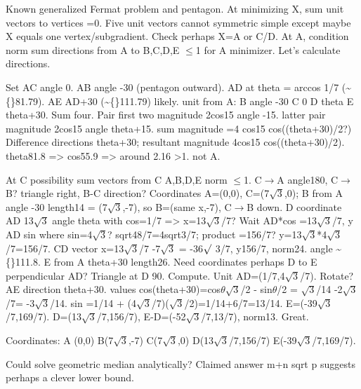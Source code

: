 \begin{decodedreasoningpanel}
Known generalized Fermat problem and pentagon. At minimizing X, sum unit vectors to vertices =0. Five unit vectors cannot symmetric simple except maybe X equals one vertex/subgradient. Check perhaps X=A or C/D. At A, condition norm sum directions from A to B,C,D,E \ensuremath{\leq}1 for A minimizer. Let's calculate directions.

Set AC angle 0. AB angle -30 (pentagon outward). AD at theta = arccos 1/7 (\textasciitilde\{\}81.79). AE AD+30 (\textasciitilde\{\}111.79) likely.
unit from A:
B angle -30
C 0
D theta
E theta+30.
Sum four. Pair first two magnitude 2cos15 angle -15. latter pair magnitude 2cos15 angle theta+15. sum magnitude =4 cos15 cos((theta+30)/2?) Difference directions theta+30; resultant magnitude 4cos15 cos((theta+30)/2). theta81.8 =\textgreater{} cos55.9 =\textgreater{} around 2.16 \textgreater{}1. not A.

At C possibility sum vectors from C A,B,D,E norm \ensuremath{\leq}1. C\ensuremath{\rightarrow}A angle180, C\ensuremath{\rightarrow}B? triangle right, B-C direction? Coordinates A=(0,0), C=(7\ensuremath{\sqrt{3}},0); B from A angle -30 length14 = (7\ensuremath{\sqrt{3}},-7), so B=(same x,-7), C\ensuremath{\rightarrow}B down. D coordinate AD 13\ensuremath{\sqrt{3}} angle theta with cos=1/7 =\textgreater{} x=13\ensuremath{\sqrt{3}}/7? Wait AD*cos =13\ensuremath{\sqrt{3}}/7, y AD sin where sin=4\ensuremath{\sqrt{3}}? sqrt48/7=4sqrt3/7; product =156/7? y=13\ensuremath{\sqrt{3}}*4\ensuremath{\sqrt{3}}/7=156/7. CD vector x=13\ensuremath{\sqrt{3}}/7 -7\ensuremath{\sqrt{3}} = -36\ensuremath{\surd}
  3/7, y156/7, norm24. angle \textasciitilde\{\}111.8.
E from A theta+30 length26. Need coordinates perhaps D to E perpendicular AD? Triangle at D 90. Compute. Unit AD=(1/7,4\ensuremath{\sqrt{3}}/7). Rotate? AE direction theta+30. values cos(theta+30)=cos\ensuremath{\theta}\ensuremath{\sqrt{3}}/2 - sin\ensuremath{\theta}/2 = \ensuremath{\sqrt{3}}/14 -2\ensuremath{\sqrt{3}}/7= -3\ensuremath{\sqrt{3}}/14. sin =1/14 + (4\ensuremath{\sqrt{3}}/7)(\ensuremath{\sqrt{3}}/2)=1/14+6/7=13/14. E=(-39\ensuremath{\sqrt{3}}/7,169/7). D=(13\ensuremath{\sqrt{3}}/7,156/7), E-D=(-52\ensuremath{\sqrt{3}}/7,13/7), norm13. Great.

Coordinates:
A (0,0)
B(7\ensuremath{\sqrt{3}},-7)
C(7\ensuremath{\sqrt{3}},0)
D(13\ensuremath{\sqrt{3}}/7,156/7)
E(-39\ensuremath{\sqrt{3}}/7,169/7).

Could solve geometric median analytically? Claimed answer m+n sqrt p suggests perhaps a clever lower bound.


\end{decodedreasoningpanel}
